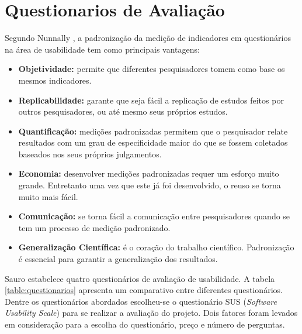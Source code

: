 \section{Questionarios de Avaliação}
Segundo Nunnally \cite{nunnally1978c}, a padronização da medição de indicadores em questionários na área de usabilidade tem como principais vantagens:
\begin{itemize}
\item \textbf{Objetividade:} permite que diferentes pesquisadores tomem como base os mesmos indicadores.
\item \textbf{Replicabilidade:} garante que seja fácil a replicação de estudos feitos por outros pesquisadores, ou até mesmo seus próprios estudos.
\item \textbf{Quantificação:} medições padronizadas permitem que o pesquisador relate resultados com um grau de especificidade maior do que se fossem coletados baseados nos seus próprios julgamentos.
\item \textbf{Economia:} desenvolver medições padronizadas requer um esforço muito grande. Entretanto uma vez que este já foi desenvolvido, o reuso se torna muito mais fácil.
\item \textbf{Comunicação:} se torna fácil a comunicação entre pesquisadores quando se tem um processo de medição  padronizado.
 \item \textbf{Generalização Científica:} é o coração do trabalho científico. Padronização é essencial para garantir a generalização dos resultados.

\end{itemize}
 
Sauro \cite{sauro2016quantifying} estabelece quatro questionários de avaliação de usabilidade. A tabela \ref{table:questionarios} apresenta um comparativo entre diferentes questionários. Dentre os questionários abordados escolheu-se o questionário SUS (\textit{Software Usability Scale}) para se realizar a avaliação do projeto. Dois fatores foram levados em consideração para a escolha do questionário, preço e número de perguntas. 


